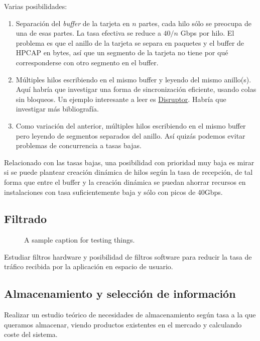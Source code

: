 \documentclass[twoside, draft]{epstfg}
\begin{document}
Varias posibilidades:

\begin{enumerate}
\item Separación del \textit{buffer} de la tarjeta en $n$ partes, cada hilo sólo se preocupa de una de esas partes. La tasa efectiva se reduce a $40 / n$ Gbps por hilo. El problema es que el anillo de la tarjeta se separa en paquetes y el buffer de HPCAP en bytes, así que un segmento de la tarjeta no tiene por qué corresponderse con otro segmento en el buffer.
\item Múltiples hilos escribiendo en el mismo buffer y leyendo del mismo anillo(s). Aquí habría que investigar una forma de sincronización eficiente, usando colas sin bloqueos. Un ejemplo interesante a leer es \href{http://disruptor.googlecode.com/files/Disruptor-1.0.pdf}{Disruptor}. Habría que investigar más bibliografía.
\item Como variación del anterior, múltiples hilos escribiendo en el mismo buffer pero leyendo de segmentos separados del anillo. Así quizás podemos evitar problemas de concurrencia a tasas bajas.
\end{enumerate}

Relacionado con las tasas bajas, una posibilidad con prioridad muy baja es mirar si se puede plantear creación dinámica de hilos según la tasa de recepción, de tal forma que entre el buffer y la creación dinámica se puedan ahorrar recursos en instalaciones con tasa suficientemente baja y sólo con picos de 40Gbps.

\subsection{Filtrado}

\begin{figure}
\caption{A sample caption for testing things.}
\end{figure}

Estudiar filtros hardware y posibilidad de filtros software para reducir la tasa de tráfico recibida por la aplicación en espacio de usuario.

\subsection{Almacenamiento y selección de información}

Realizar un estudio teórico de necesidades de almacenamiento según tasa a la que queramos almacenar, viendo productos existentes en el mercado y calculando coste del sistema.
\end{document}
